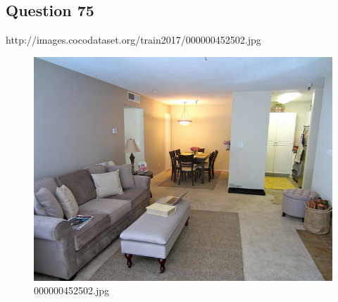 \subsection*{Question 75}
http://images.cocodataset.org/train2017/000000452502.jpg
\begin{figure}[h]
    \centering
    \includegraphics[width=0.8\linewidth]{../image set/hard/000000452502.jpg}
    \caption{000000452502.jpg}
\end{figure}
